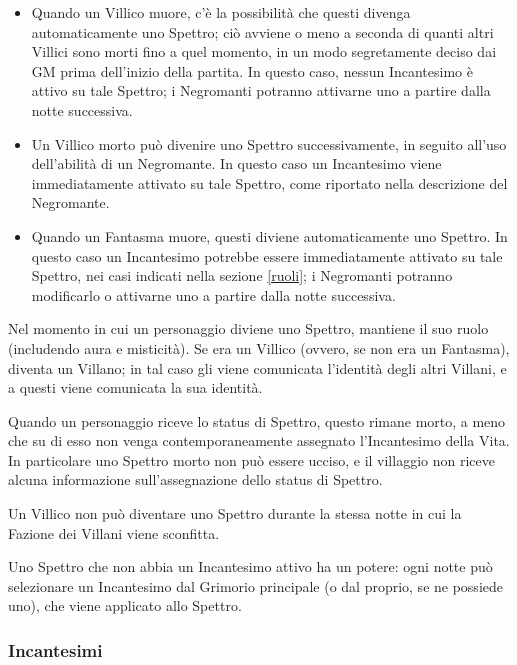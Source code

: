 \documentclass[a4paper,10pt]{article}
\begin{document}
\begin{itemize}
	\begin{itemize}
		\item Quando un Villico muore, c'è la possibilità che questi divenga automaticamente uno Spettro; ciò avviene o meno a seconda di quanti altri Villici sono morti fino a quel momento, in un modo segretamente deciso dai GM prima dell'inizio della partita. In questo caso, nessun Incantesimo è attivo su tale Spettro; i Negromanti potranno attivarne uno a partire dalla notte successiva.
		
		\item Un Villico morto può divenire uno Spettro successivamente, in seguito all'uso dell'abilità di un Negromante. In questo caso un Incantesimo viene immediatamente attivato su tale Spettro, come riportato nella descrizione del Negromante.
		
		\item Quando un Fantasma muore, questi diviene automaticamente uno Spettro. In questo caso un Incantesimo potrebbe essere immediatamente attivato su tale Spettro, nei casi indicati nella sezione \ref{ruoli}; i Negromanti potranno modificarlo o attivarne uno a partire dalla notte successiva.
	\end{itemize}
 	
 	Nel momento in cui un personaggio diviene uno Spettro, mantiene il suo ruolo (includendo aura e misticità). Se era un Villico (ovvero, se non era un Fantasma), diventa un Villano; in tal caso gli viene comunicata l'identità degli altri Villani, e a questi viene comunicata la sua identità.
 	
	Quando un personaggio riceve lo status di Spettro, questo rimane morto, a meno che su di esso non venga contemporaneamente assegnato l'Incantesimo della Vita. In particolare uno Spettro morto non può essere ucciso, e il villaggio non riceve alcuna informazione sull'assegnazione dello status di Spettro.
	
	Un Villico non può diventare uno Spettro durante la stessa notte in cui la Fazione dei Villani viene sconfitta.

    Uno Spettro che non abbia un Incantesimo attivo ha un potere: ogni notte può selezionare un Incantesimo dal Grimorio principale (o dal proprio, se ne possiede uno), che viene applicato allo Spettro.
	
\end{itemize}


\subsubsection*{Incantesimi}\label{incantesimi}
\end{document}
